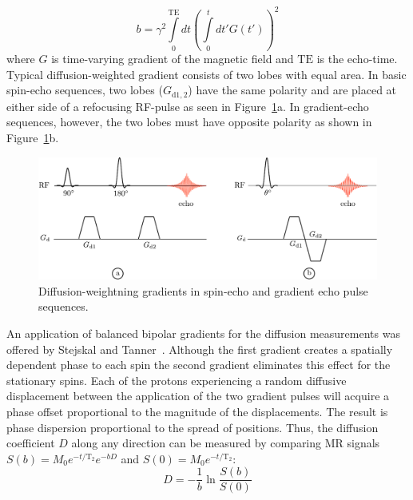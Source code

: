\begin{equation}\label{eq: b-value}
b=\gamma^2\int\limits_{0}^{\mathrm{TE}}dt\left(\int\limits_{0}^{t}dt'G(t')\right)^2
\end{equation}
where $G$ is time-varying gradient of the magnetic field and $\mathrm{TE}$ is the echo-time.
Typical diffusion-weighted gradient consists of two lobes with equal area. In basic spin-echo sequences, two lobes ($G_{\mathrm{d1,2}}$) have the same polarity and are placed at either side of a refocusing RF-pulse as seen in Figure~\ref{fig: DTISeq}a. 
In gradient-echo sequences, however, the two lobes must have opposite polarity as shown in Figure~\ref{fig: DTISeq}b.
\begin{figure}[t]
\vspace{+0.2cm}
\centering
\includegraphics[width=\textwidth]{Figures/DiffusionPS.pdf}
\caption[Diffusion-weightning gradients in spin-echo and gradient echo pulse sequences]{Diffusion-weightning gradients in spin-echo and gradient echo pulse sequences.}\label{fig: DTISeq}
\end{figure}
An application of balanced bipolar gradients for the diffusion measurements was offered by Stejskal and Tanner~\cite{Stejskal}. 
Although the first gradient creates a spatially dependent phase to each spin the second gradient eliminates this effect for the stationary spins. 
Each of the protons experiencing a random diffusive displacement between the application of the two gradient pulses will acquire a phase offset proportional to the magnitude of the displacements. 
The result is phase dispersion proportional to the spread of positions. Thus, the diffusion coefficient $D$ along any direction can be measured by comparing MR signals $S(b)=M_0e^{-t/\mathrm{T_2}}e^{-bD}$ and $S(0)=M_0e^{-t/\mathrm{T_2}}$:
\begin{equation}\label{eq: Diffusion from bvalue}
D=-\frac{1}{b}\ln{\frac{S(b)}{S(0)}}
\end{equation}

